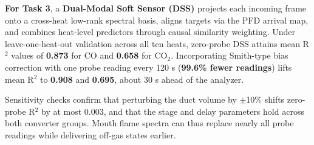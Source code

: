 \textbf{For Task 3}, a \textbf{Dual-Modal Soft Sensor (DSS)} projects each incoming frame onto a cross-heat low-rank spectral basis, aligns targets via the PFD arrival map, and combines heat-level predictors through causal similarity weighting. Under leave-one-heat-out validation across all ten heats, zero-probe DSS attains mean R\ensuremath{^{2}} values of \textbf{0.873} for CO and \textbf{0.658} for CO\ensuremath{_{2}}. Incorporating Smith-type bias correction with one probe reading every 120 s (\textbf{99.6\% fewer readings}) lifts mean R\ensuremath{^{2}} to \textbf{0.908} and \textbf{0.695}, about 30 s ahead of the analyzer.

Sensitivity checks confirm that perturbing the duct volume by \ensuremath{\pm}10\% shifts zero-probe R\ensuremath{^{2}} by at most 0.003, and that the stage and delay parameters hold across both converter groups. Mouth flame spectra can thus replace nearly all probe readings while delivering off-gas states earlier.



